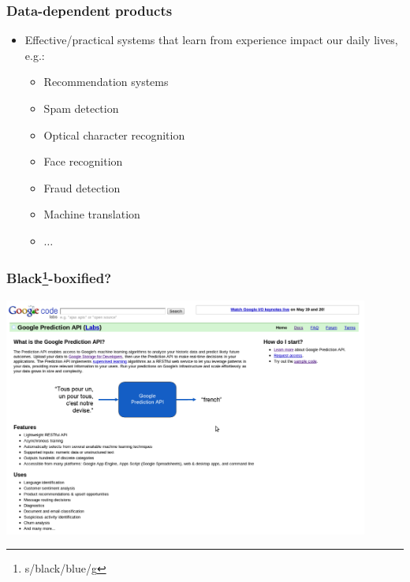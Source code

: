 \documentclass[xcolor=dvipsnames, 9pt]{beamer}
\begin{document}
\begin{frame}
  \frametitle{Data-dependent products}

  \begin{itemize}
    \item Effective/practical systems that learn from experience impact our daily lives, e.g.:
      \begin{itemize}
        \item Recommendation systems
        \item Spam detection
        \item Optical character recognition
        \item Face recognition
        \item Fraud detection
        \item Machine translation
        \item $\ldots$
      \end{itemize}
  \end{itemize}

\end{frame}

\begin{frame}[fragile]
    \frametitle{Black\footnote{s/black/blue/g}-boxified?}
    \begin{center}
        \includegraphics[width=0.9\textwidth]{google_pred_api.png}
    \end{center}
\end{frame}
\end{document}
